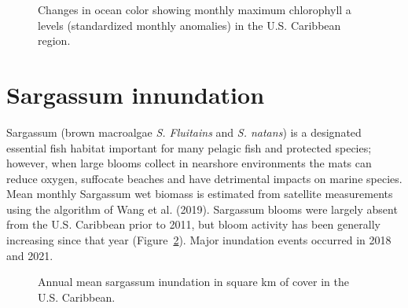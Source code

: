 \documentclass[
  letterpaper,
  oneside,
  open=any]{scrbook}
\begin{document}
\begin{figure}


\caption{\label{fig-chl}Changes in ocean color showing monthly maximum
chlorophyll a levels (standardized monthly anomalies) in the U.S.
Caribbean region.}

\end{figure}%

\section{Sargassum innundation}\label{sargassum-innundation}

Sargassum (brown macroalgae \emph{S. Fluitains} and \emph{S. natans}) is
a designated essential fish habitat important for many pelagic fish and
protected species; however, when large blooms collect in nearshore
environments the mats can reduce oxygen, suffocate beaches and have
detrimental impacts on marine species. Mean monthly Sargassum wet
biomass is estimated from satellite measurements using the algorithm of
Wang et al. (2019). Sargassum blooms were largely absent from the U.S.
Caribbean prior to 2011, but bloom activity has been generally
increasing since that year (Figure~\ref{fig-sarg}). Major inundation
events occurred in 2018 and 2021.

\begin{figure}


\caption{\label{fig-sarg}Annual mean sargassum inundation in square km
of cover in the U.S. Caribbean.}

\end{figure}%
\end{document}
